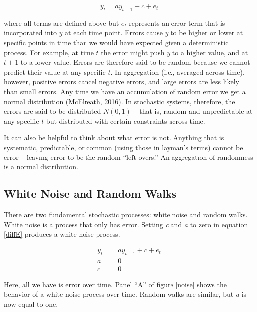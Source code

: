 \documentclass[english,,man]{apa6}
\theoremstyle{definition}
\theoremstyle{definition}
\theoremstyle{definition}
\theoremstyle{remark}
\begin{document}
\begin{equation}
\label{diffE}
y_{t} = a y_{t-1} + c + e_{t}
\end{equation}

\noindent where all terms are defined above but \(e_{t}\) represents an
error term that is incorporated into \(y\) at each time point. Errors
cause \(y\) to be higher or lower at specific points in time than we
would have expected given a deterministic process. For example, at time
\(t\) the error might push \(y\) to a higher value, and at \(t+1\) to a
lower value. Errors are therefore said to be random because we cannot
predict their value at any specific \(t\). In aggregation (i.e.,
averaged across time), however, positive errors cancel negative errors,
and large errors are less likely than small errors. Any time we have an
accumulation of random error we get a normal distribution (McElreath,
2016). In stochastic systems, therefore, the errors are said to be
distributed \(N(0, 1)\) -- that is, random and unpredictable at any
specific \(t\) but distributed with certain constraints across time.

It can also be helpful to think about what error is not. Anything that
is systematic, predictable, or common (using those in layman's terms)
cannot be error -- leaving error to be the random \enquote{left overs.}
An aggregation of randomness is a normal distribution.

\hypertarget{white-noise-and-random-walks}{%
\subsection{White Noise and Random
Walks}\label{white-noise-and-random-walks}}

There are two fundamental stochastic processes: white noise and random
walks. White noise is a process that only has error. Setting \emph{c}
and \emph{a} to zero in equation \ref{diffE} produces a white noise
process.

\begin{equation}
\begin{split}
\label{whitenoise}
y_{t} &= a y_{t-1} + c + e_{t} \\
a &= 0 \\
c &= 0
\end{split}
\end{equation}

\noindent Here, all we have is error over time. Panel \enquote{A} of
figure \ref{noise} shows the behavior of a white noise process over
time. Random walks are similar, but \emph{a} is now equal to one.
\end{document}
